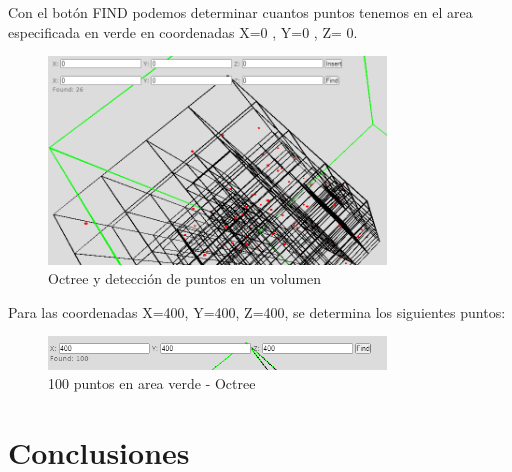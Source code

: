 \documentclass{article}
\begin{document}
Con el botón FIND podemos determinar cuantos puntos tenemos en el area especificada en verde en coordenadas X=0 , Y=0 , Z= 0.

\begin{figure}[H]
\centering
\includegraphics[width=0.8\textwidth]{img/oct_100verde.png}
\caption{Octree y detección de puntos en un volumen}
\end{figure}

Para las coordenadas X=400, Y=400, Z=400, se determina los siguientes puntos:

\begin{figure}[H]
\centering
\includegraphics[width=0.8\textwidth]{img/oct_found100.png}
\caption{100 puntos en area verde - Octree}
\end{figure}

\section{Conclusiones}


	
	
	
\end{document}
